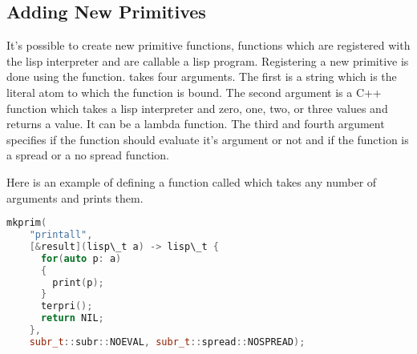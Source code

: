 \subsection{Adding New Primitives}
It's possible to create new primitive functions, functions which are
registered with the lisp interpreter and are callable a lisp
program. Registering a new primitive is done using the
 function.  takes four
arguments. The first is a string which is the literal atom to which
the function is bound. The second argument is a \textsf{C++} function
which takes a lisp interpreter and zero, one, two, or three
 values and returns a  value. It can be a lambda
function.  The third and fourth argument specifies if the function
should evaluate it's argument or not and if the function is a spread
or a no spread function.

Here is an example of defining a function called  which
takes any number of arguments and prints them.

\begin{lstlisting}[language=c++]
  mkprim(
    "printall",
    [&result](lisp\_t a) -> lisp\_t {
      for(auto p: a)
      {
        print(p);
      }
      terpri();
      return NIL;
    },
    subr_t::subr::NOEVAL, subr_t::spread::NOSPREAD);
\end{lstlisting}
